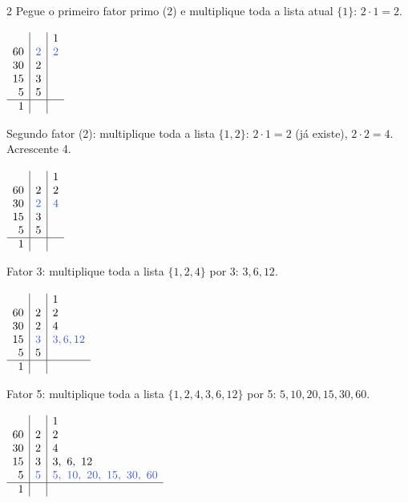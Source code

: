 \documentclass[12pt]{article}
\begin{document}
\begin{multicols}{2}
Pegue o primeiro fator primo (2) e multiplique toda a lista atual $\{1\}$: $2 \cdot 1 = 2$.

\vspace{8px}
$\begin{array}[t]{r |l|l}&&1\\
60&\textcolor{iris}{2}&\textcolor{iris}{2}\\
30&2\\
15&3\\
5&5\\
\hline1&\\
\end{array}$
\vspace{8px}

Segundo fator (2): multiplique toda a lista $\{1, 2\}$: $2 \cdot 1 = 2$ (já existe), $2 \cdot 2 = 4$. Acrescente 4.

\vspace{8px}
$\begin{array}[t]{r |l|l}&&1\\
60&2&2\\
30&\textcolor{iris}{2}&\textcolor{iris}{4}\\
15&3\\
5&5\\
\hline1&\\
\end{array}$
\vspace{8px}

Fator 3: multiplique toda a lista $\{1, 2, 4\}$ por 3: $3, 6, 12$.

\vspace{8px}
$\begin{array}[t]{r |l|l}&&1\\
60&2&2\\
30&2&4\\
15&\textcolor{iris}{3}&\textcolor{iris}{3, 6, 12}\\
5&5\\
\hline1&\\
\end{array}$
\vspace{8px}

Fator 5: multiplique toda a lista $\{1, 2, 4, 3, 6, 12\}$ por 5: $5, 10, 20, 15, 30, 60$.

\vspace{8px}
$\begin{array}[t]{r |l|l}&&1\\
60&2&2\\
30&2&4\\
15&3&3,~6,~12\\
5&\textcolor{iris}{5}&\textcolor{iris}{5,~10,~20,~15,~30,~60}\\
\hline1&\\
\end{array}$
\vspace{8px}


\end{multicols}
\end{document}

